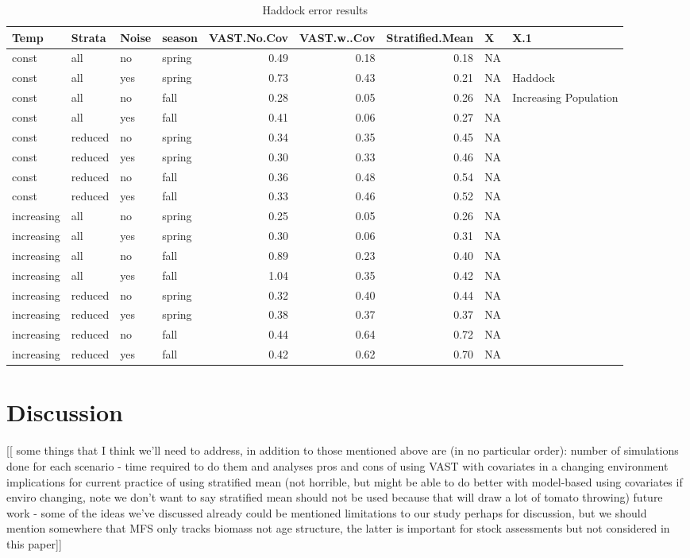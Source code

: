 \documentclass[
  12pt,
]{article}
\begin{document}
\begin{table}

\caption{\label{tab:unnamed-chunk-1}Haddock error results}
\centering
\begin{tabular}[t]{l|l|l|l|r|r|r|l|l}
\hline
Temp & Strata & Noise & season & VAST.No.Cov & VAST.w..Cov & Stratified.Mean & X & X.1\\
\hline
const & all & no & spring & 0.49 & 0.18 & 0.18 & NA & \\
\hline
const & all & yes & spring & 0.73 & 0.43 & 0.21 & NA & Haddock\\
\hline
const & all & no & fall & 0.28 & 0.05 & 0.26 & NA & Increasing Population\\
\hline
const & all & yes & fall & 0.41 & 0.06 & 0.27 & NA & \\
\hline
const & reduced & no & spring & 0.34 & 0.35 & 0.45 & NA & \\
\hline
const & reduced & yes & spring & 0.30 & 0.33 & 0.46 & NA & \\
\hline
const & reduced & no & fall & 0.36 & 0.48 & 0.54 & NA & \\
\hline
const & reduced & yes & fall & 0.33 & 0.46 & 0.52 & NA & \\
\hline
increasing & all & no & spring & 0.25 & 0.05 & 0.26 & NA & \\
\hline
increasing & all & yes & spring & 0.30 & 0.06 & 0.31 & NA & \\
\hline
increasing & all & no & fall & 0.89 & 0.23 & 0.40 & NA & \\
\hline
increasing & all & yes & fall & 1.04 & 0.35 & 0.42 & NA & \\
\hline
increasing & reduced & no & spring & 0.32 & 0.40 & 0.44 & NA & \\
\hline
increasing & reduced & yes & spring & 0.38 & 0.37 & 0.37 & NA & \\
\hline
increasing & reduced & no & fall & 0.44 & 0.64 & 0.72 & NA & \\
\hline
increasing & reduced & yes & fall & 0.42 & 0.62 & 0.70 & NA & \\
\hline
\end{tabular}
\end{table}

\section{Discussion}

{[}{[} some things that I think we'll need to address, in addition to those mentioned above are (in no particular order):
number of simulations done for each scenario - time required to do them and analyses
pros and cons of using VAST with covariates in a changing environment
implications for current practice of using stratified mean (not horrible, but might be able to do better with model-based using covariates if enviro changing, note we don't want to say stratified mean should not be used because that will draw a lot of tomato throwing)
future work - some of the ideas we've discussed already could be mentioned
limitations to our study
perhaps for discussion, but we should mention somewhere that MFS only tracks biomass not age structure, the latter is important for stock assessments but not considered in this paper{]}{]}
\end{document}
